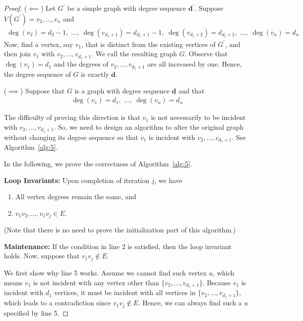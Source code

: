 \documentclass[thmcnt=section, 12pt, color=cyan]{my-elegantbook}
\begin{document}
\begin{proof}
	($\impliedby$) 
	Let $G^\prime$ be a simple graph with 
	degree sequence $\mathbf{d}^\prime$.
	Suppose $V(G^\prime) = v_2, \ldots, v_n$ and 
	\begin{align*}
		\deg(v_2) = d_2 - 1, \; \ldots, \;
		\deg(v_{d_1 + 1}) = d_{d_1 + 1} - 1, \;
		\deg(v_{d_1 + 2}) = d_{d_1 + 2}, \; \ldots, \;
		\deg(v_n) = d_n
	\end{align*}
	Now, find a vertex, say $v_1$, that is distinct from 
	the existing vertices of $G^\prime$,
	and then join $v_1$ with $v_2, \ldots, v_{d_1 + 1}$.
	We call the resulting graph $G$.
	Observe that $\deg(v_1) = d_1$ and 
	the degrees of $v_2, \ldots, v_{d_1 + 1}$ are all increased by one.
	Hence, the degree sequence of $G$ is exactly $\mathbf{d}$.

	($\implies$)
	Suppose that $G$ is a graph with degree sequence $\mathbf{d}$
	and that
	\begin{align*}
		\deg(v_1) = d_1, \; \ldots, \; \deg(v_n) = d_n
	\end{align*}
	\begin{note}
		The difficulty of proving this direction is 
		that $v_1$ is not necessarily
		to be incident with	$v_2, \ldots, v_{d_1 + 1}$.
		So, we need to design an algorithm to 
		alter the original graph without 
		changing its degree sequence 
		so that $v_1$ is incident with $v_2, \ldots, v_{d_1 + 1}$.
		See Algorithm~\ref{alg:5}.
	\end{note}
	\noindent In the following, we prove the correctness 
	of Algorithm~\ref{alg:5}.

	\noindent\textbf{Loop Invariants:}
	Upon completion of iteration $j$, we have 
	\begin{enumerate}
		\item All vertex degrees remain the same, and 
		\item $v_1 v_2, \ldots, v_1 v_j \in E$.
	\end{enumerate}
	(Note that there is no need to prove the initialization part
	of this algorithm.)

	\noindent\textbf{Maintenance:}
	If the condition in line 2 is satisfied,
	then the loop invariant holds.
	Now, suppose that $v_1 v_j \notin E$.

	We first show why line 5 works.
	Assume we cannot find such vertex $u$,
	which means $v_1$ is not incident with any vertex 
	other than $\{v_2, \ldots, v_{d_1 + 1}\}$.
	Because $v_1$ is incident with $d_1$ vertices,
	it must be incident with all vertices 
	in $\{v_2, \ldots, v_{d_1 + 1}\}$,
	which leads to a contradiction since $v_1 v_j \notin E$.
	Hence, we can always find such a $u$ specified by line 5.


\end{proof}
\end{document}
